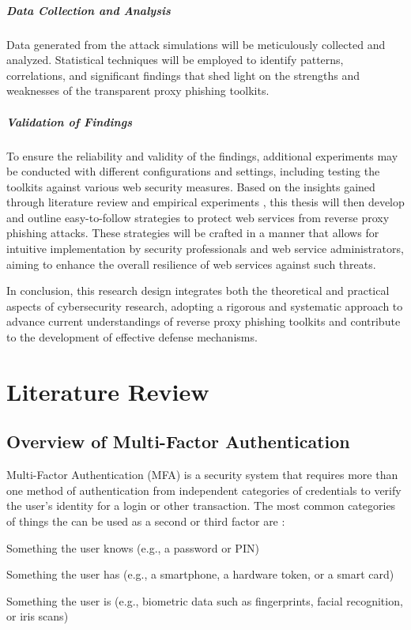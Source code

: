 \documentclass[12pt]{scrbook}
\begin{document}
\paragraph{Data Collection and Analysis}
Data generated from the attack simulations
will be meticulously collected and analyzed. Statistical techniques will be
employed to identify patterns, correlations, and significant findings that
shed light on the strengths and weaknesses of the transparent proxy phishing toolkits.
\paragraph{Validation of Findings}
To ensure the reliability and validity of the
findings, additional experiments may be conducted with different configurations
and settings, including testing the toolkits against various web security measures.
Based on the insights gained through literature review and empirical experiments
, this thesis will then develop and outline easy-to-follow strategies to protect
web services from reverse proxy phishing attacks. These strategies will be
crafted in a manner that allows for intuitive implementation by security professionals
and web service administrators, aiming to enhance the overall resilience of
web services against such threats.

In conclusion, this research design integrates both the theoretical and practical
aspects of cybersecurity research, adopting a rigorous and systematic approach
to advance current understandings of reverse proxy phishing toolkits and contribute
to the development of effective defense mechanisms.

\newpage \chapter{Literature Review} \section{Overview of Multi-Factor
Authentication}

Multi-Factor Authentication (MFA) is a security system that requires more than
one method of authentication from independent categories of credentials to
verify the user's identity for a login or other transaction. The most common
categories of things the can be used as a second or third factor are \cite{mfa}:
\begin{compactitem}
  \item Something the user knows (e.g., a password or PIN)
  \item Something the user has (e.g., a smartphone, a hardware token, or a smart card)
  \item Something the user is (e.g., biometric data such as fingerprints, facial recognition, or iris scans)
\end{compactitem}
\end{document}
